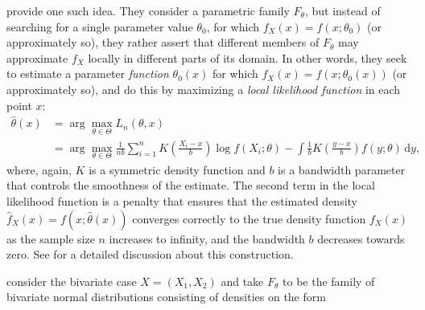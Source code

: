 \cite{hjor:jone:1996} provide one such idea. They consider a parametric family $F_{\theta}$, but instead of searching for a single parameter value $\theta_0$, for which $f_X\left(x\right) = f\left(x;\theta_0\right)$ (or approximately so), they rather assert that different members of $F_{\theta}$ may approximate $f_X$ locally in different parts of its domain. In other words, they seek to estimate a parameter \emph{function} $\theta_0\left(x\right)$ for which $f_X\left(x\right) = f\left(x;\theta_0\left(x\right)\right)$ (or approximately so), and do this by maximizing a \emph{local likelihood function} in each point $x$:
\begin{align}
\widehat\theta\left(x\right) 
&= \arg\max_{\theta \in \Theta} L_n\left(\theta, x\right) \nonumber\\ 
&= \arg\max_{\theta \in \Theta} \frac{1}{nb}\sum_{i=1}^n K\left(\frac{X_i - x}{b}\right)\log f\left(X_i; \theta\right) - \int \frac{1}{b}K\left(\frac{y - x}{b}\right)f\left(y;\theta\right)\,\textrm{d}y,
\label{eq:loclik}
\end{align}
where, again, $K$ is a symmetric density function and $b$ is a bandwidth parameter that controls the smoothness of the estimate. The second term in the local likelihood function is a penalty that ensures that the estimated density $\widehat f_X\left(x\right) = f\left(x; \widehat\theta\left(x\right)\right)$ converges correctly to the true density function $f_X\left(x\right)$ as the sample size $n$ increases to infinity, and the bandwidth $b$ decreases towards zero. See \cite{hjor:jone:1996} for a detailed discussion about this construction.

\cite{tjos:huft:2013} consider the bivariate case $X = \left(X_1, X_2\right)$ and take $F_{\theta}$ to be the family of bivariate normal distributions consisting of densities on the form

